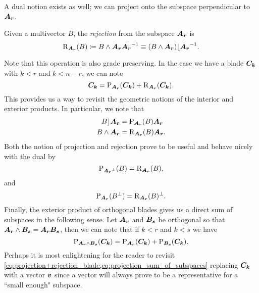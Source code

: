 A dual notion exists as well; we can project onto the subspace perpendicular to $\boldsymbol{A_r}$.
\begin{definition}
Given a multivector $B$, the \emph{rejection} from the subspace $\boldsymbol{A_r}$ is
\begin{equation}
\label{eq:rejection}
\operatorname{R}_{\boldsymbol{A_r}}(B) \coloneqq B \wedge \boldsymbol{A_r} \boldsymbol{A_r}^{-1} \equiv (B\wedge \boldsymbol{A_r})\lfloor \boldsymbol{A_r}^{-1}.
\end{equation}
\end{definition}
Note that this operation is also grade preserving. In the case we have a blade $\boldsymbol{C_k}$ with $k<r$ and $k<n-r$, we can note
\begin{equation}
\label{eq:projection+rejection_blade}
\boldsymbol{C_k}=\operatorname{P}_{\boldsymbol{A_r}}(\boldsymbol{C_k}) + \operatorname{R}_{\boldsymbol{A_r}}(\boldsymbol{C_k}).
\end{equation}
This provides us a way to revisit the geometric notions of the interior and exterior products. In particular, we note that
\begin{align}
    B \rfloor \boldsymbol{A_r} &= \operatorname{P}_{\boldsymbol{A_r}} (B) \boldsymbol{A_r}\\
    B \wedge \boldsymbol{A_r} &= \operatorname{R}_{\boldsymbol{A_r}}(B) \boldsymbol{A_r}.
\end{align}
Both the notion of projection and rejection prove to be useful and behave nicely with the dual by
\begin{equation}
\label{eq:projection_rejection_duality}
\operatorname{P}_{\boldsymbol{A_r}^\perp}(B) = \operatorname{R}_{\boldsymbol{A_r}}(B),
\end{equation}
and
\begin{equation}
\operatorname{P}_{\boldsymbol{A_r}}(B^\perp) = \operatorname{R}_{\boldsymbol{A_r}}(B)^\perp.
\end{equation}
Finally, the exterior product of orthogonal blades gives us a direct sum of subspaces in the following sense. Let $\boldsymbol{A_r}$ and $\boldsymbol{B_s}$ be orthogonal so that $\boldsymbol{A_r}\wedge \boldsymbol{B_s}=\boldsymbol{A_r}\boldsymbol{B_s}$, then we can note that if $k<r$ and $k<s$ we have
\begin{equation}
\label{eq:projection_sum_of_subspaces}
    \operatorname{P}_{\boldsymbol{A_r}\wedge \boldsymbol{B_s}} (\boldsymbol{C_k}) = \operatorname{P}_{\boldsymbol{A_r}}(\boldsymbol{C_k}) + \operatorname{P}_{\boldsymbol{B_s}}(\boldsymbol{C_k}).
\end{equation}
Perhaps it is most enlightening for the reader to revisit \cref{eq:projection+rejection_blade,eq:projection_sum_of_subspaces} replacing $\boldsymbol{C_k}$ with a vector $\boldsymbol{v}$ since a vector will always prove to be a representative for a ``small enough" subspace.


